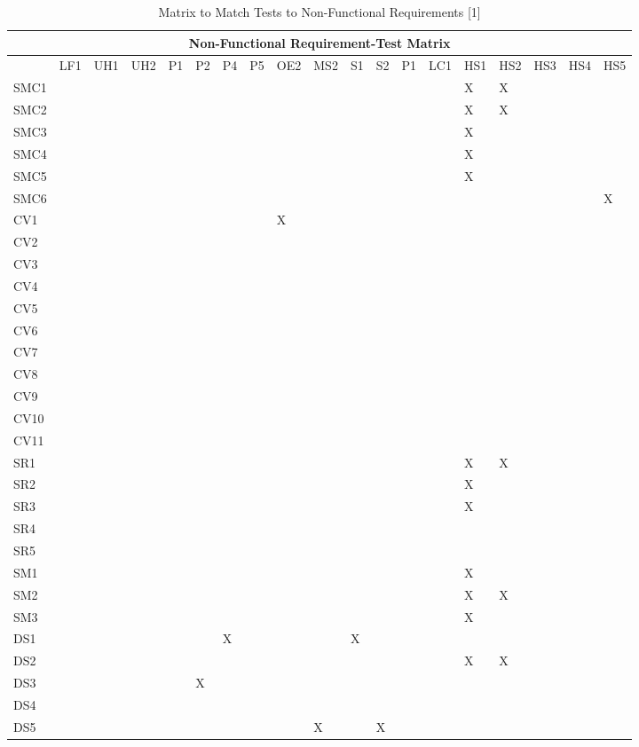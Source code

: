 \documentclass[11pt]{article}
\begin{document}
\begin{table}[H]
\centering
\caption{Matrix to Match Tests to Non-Functional Requirements [1]}
\label{my-label}
\begin{tabular}{| l | l | l | l | l | l | l | l | l | l | l | l | l | l | l | l | l | l | l |}
\hline
\multicolumn{19}{|c|}{\textbf{Non-Functional Requirement-Test Matrix}}                          \\ \hline
 & \tiny{LF1} & \tiny{UH1} & \tiny{UH2} & \tiny{P1} & \tiny{P2} & \tiny{P4} & \tiny{P5} & \tiny{OE2} & \tiny{MS2} & \tiny{S1} & \tiny{S2} & \tiny{P1} & \tiny{LC1} & \tiny{HS1} & \tiny{HS2} & \tiny{HS3} & \tiny{HS4} & \tiny{HS5} \\ \hline
SMC1&&&&&&&&&&&&&&X&X&&& \\ \hline
SMC2&&&&&&&&&&&&&&X&X&&& \\ \hline
SMC3&&&&&&&&&&&&&&X&&&& \\ \hline
SMC4&&&&&&&&&&&&&&X&&&& \\ \hline
SMC5&&&&&&&&&&&&&&X&&&& \\ \hline
SMC6&&&&&&&&&&&&&&&&&&X \\ \hline
CV1&&&&&&&&X&&&&&&&&&& \\ \hline
CV2&&&&&&&&&&&&&&&&&& \\ \hline
CV3&&&&&&&&&&&&&&&&&& \\ \hline
CV4&&&&&&&&&&&&&&&&&& \\ \hline
CV5&&&&&&&&&&&&&&&&&& \\ \hline
CV6&&&&&&&&&&&&&&&&&& \\ \hline
CV7&&&&&&&&&&&&&&&&&& \\ \hline
CV8&&&&&&&&&&&&&&&&&& \\ \hline
CV9&&&&&&&&&&&&&&&&&& \\ \hline
CV10&&&&&&&&&&&&&&&&&& \\ \hline
CV11&&&&&&&&&&&&&&&&&& \\ \hline
SR1&&&&&&&&&&&&&&X&X&&& \\ \hline
SR2&&&&&&&&&&&&&&X&&&& \\ \hline
SR3&&&&&&&&&&&&&&X&&&& \\ \hline
SR4&&&&&&&&&&&&&&&&&& \\ \hline
SR5&&&&&&&&&&&&&&&&&& \\ \hline
SM1&&&&&&&&&&&&&&X&&&& \\ \hline
SM2&&&&&&&&&&&&&&X&X&&& \\ \hline
SM3&&&&&&&&&&&&&&X&&&& \\ \hline
DS1&&&&&&X&&&&X&&&&&&&& \\ \hline
DS2&&&&&&&&&&&&&&X&X&&& \\ \hline
DS3&&&&&X&&&&&&&&&&&&& \\ \hline
DS4&&&&&&&&&&&&&&&&&& \\ \hline
DS5&&&&&&&&&X&&X&&&&&&& \\ \hline
\end{tabular}
\end{table}
\end{document}
